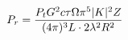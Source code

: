 \documentclass[preview]{standalone}
\begin{document}
\begin{align*}
\special{dvisvgm:raw <g id='unique000'>}P_r = \frac{P_t G^2 c \tau \Omega \pi^5 |K|^2 Z}{(4 \pi)^3 L \cdot 2 \lambda^2 R^2}\special{dvisvgm:raw </g>}
\end{align*}
\end{document}
